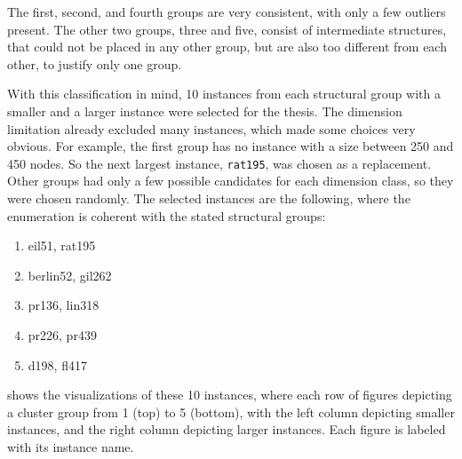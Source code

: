 The first, second, and fourth groups are very consistent, with only a few outliers present. The other two groups, three and five, consist of intermediate structures, that could not be placed in any other group, but are also too different from each other, to justify only one group. 

With this classification in mind, 10 instances from each structural group with a smaller and a larger instance were selected for the thesis. The dimension limitation already excluded many instances, which made some choices very obvious. For example, the first group has no instance with a size between 250 and 450 nodes. So the next largest instance, \texttt{rat195}, was chosen as a replacement. Other groups had only a few possible candidates for each dimension class, so they were chosen randomly. The selected instances are the following, where the enumeration is coherent with the stated structural groups:
\begin{enumerate}
	\item eil51, rat195
	\item berlin52, gil262
	\item pr136, lin318
	\item pr226, pr439
	\item d198, fl417
\end{enumerate}
 shows the visualizations of these 10 instances, where each row of figures depicting a cluster group from 1 (top) to 5 (bottom), with the left column depicting smaller instances, and the right column depicting larger instances. Each figure is labeled with its instance name.

